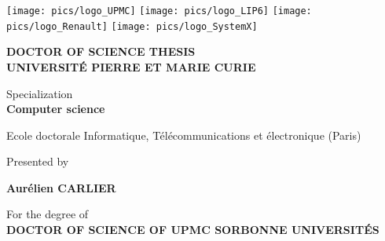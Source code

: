 \documentclass[11pt]{book}
\begin{document}
\thispagestyle{empty}

\texttt{[image: pics/logo\_UPMC]}\hfill
\texttt{[image: pics/logo\_LIP6]}\hfill
\texttt{[image: pics/logo\_Renault]}\hfill
\texttt{[image: pics/logo\_SystemX]}


{\large

\vspace*{1cm}

\begin{center}

{\bf DOCTOR OF SCIENCE THESIS \\ UNIVERSIT{\'E} PIERRE ET MARIE CURIE}

\vspace*{0.5cm}

Specialization \\ [2ex]
{\bf Computer science}\ \\ 

\vspace*{0.5cm}

Ecole doctorale Informatique, T{\'e}l{\'e}communications et {\'e}lectronique (Paris)

\vspace*{1cm}

Presented by \ \\

\vspace*{0.5cm}

{\Large {\bf Aur{\'e}lien CARLIER}}

\vspace*{1cm}
For the degree of\ \\[1ex]
{\bf DOCTOR OF SCIENCE OF UPMC SORBONNE UNIVERSIT{\'E}S} \ \\

\vspace*{1cm}

\end{center}

}
\end{document}
